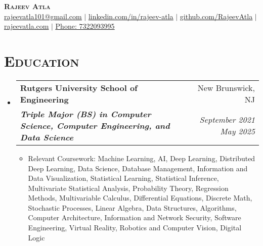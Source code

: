 \documentclass[letterpaper, 11pt]{article}
\makeatletter
\newcommand{\resumeSubheading}[4]{ %
  \vspace{-2pt}\item
    \begin{tabular*}{0.99\textwidth}[t]{l@{\extracolsep{\fill}}r}
      \textbf{#1} & #2 \\
      \textit{\small#3} & \textit{\small #4} \\
    \end{tabular*}\vspace{-7pt}
}
\newcommand{\resumeSubHeadingListStart}{\begin{itemize}[leftmargin=0.15in, label={}]}
\newcommand{\resumeSubHeadingListEnd}{\end{itemize}}
\makeatother
\begin{document}
\begin{center}
    \textbf{\Huge \scshape Rajeev Atla} \\
    \href{mailto:rajeevatla101@gmail.com}{\underline{rajeevatla101@gmail.com}} $|$ 
    \href{https://www.linkedin.com/in/rajeev-atla/}{\underline{linkedin.com/in/rajeev-atla}} $|$
    \href{https://github.com/RajeevAtla}{\underline{github.com/RajeevAtla}} $|$
    \href{https://rajeevatla.com}{\underline{rajeevatla.com}} $|$
    \href{tel:7322093995}{\underline{Phone: 7322093995}}
\end{center}

\vspace{-20pt}

\section{\scshape Education}
  \resumeSubHeadingListStart{}
    \resumeSubheading %
      {Rutgers University \textendash{} School of Engineering}{New Brunswick, NJ}
      {\textbf{Triple Major (BS) in Computer Science, Computer Engineering, and Data Science}}{September 2021 \textendash{} May 2025}
      \begin{itemize}[leftmargin=0.25in, label={}]
      \item Relevant Coursework: Machine Learning, AI, Deep Learning, Distributed Deep Learning, Data Science, Database Management, Information and Data Visualization, Statistical Learning, Statistical Inference, Multivariate Statistical Analysis, Probability Theory, Regression Methods, Multivariable Calculus, Differential Equations, Discrete Math, Stochastic Processes, Linear Algebra, Data Structures, Algorithms, Computer Architecture, Information and Network Security, Software Engineering, Virtual Reality, Robotics and Computer Vision, Digital Logic \\
\end{itemize}
  \resumeSubHeadingListEnd{}

\vspace{-37pt}

\end{document}
